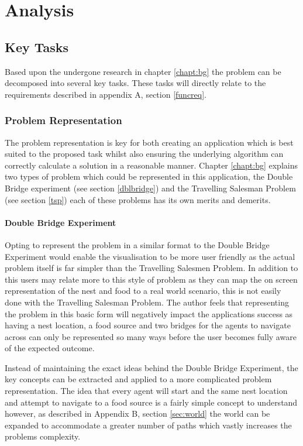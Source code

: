 
\chapter{Analysis}
\label{chap:analysis}
\section{Key Tasks}

Based upon the undergone research in chapter \ref{chapt:bg} the problem can be decomposed into several key tasks. These tasks will directly relate to the requirements described in appendix A, section \ref{funcreq}.

\subsection{Problem Representation}

The problem representation is key for both creating an application which is best suited to the proposed task whilst also ensuring the underlying algorithm can correctly calculate a solution in a reasonable manner. Chapter \ref{chapt:bg} explains two types of problem which could be represented in this application, the Double Bridge experiment (see section \ref{dblbridge}) and the Travelling Salesman Problem (see section \ref{tsp}) each of these problems has its own merits and demerits.

\subsubsection{Double Bridge Experiment}

Opting to represent the problem in a similar format to the Double Bridge Experiment would enable the visualisation to be more user friendly as the actual problem itself is far simpler than the Travelling Salesmen Problem. In addition to this users may relate more to this style of problem as they can map the on screen representation of the nest and food to a real world scenario, this is not easily done with the Travelling Salesman Problem. The author feels that representing the problem in this basic form will negatively impact the applications success as having a nest location, a food source and two bridges for the agents to navigate across can only be represented so many ways before the user becomes fully aware of the expected outcome.

Instead of maintaining the exact ideas behind the Double Bridge Experiment, the key concepts can be extracted and applied to a more complicated problem representation. The idea that every agent will start and the same nest location and attempt to navigate to a food source is a fairly simple concept to understand however, as described in Appendix B, section \ref{sec:world} the world can be expanded to accommodate a greater number of paths which vastly increases the problems complexity.

